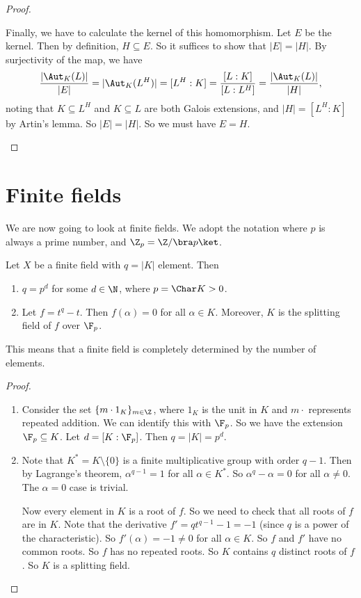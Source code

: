 \documentclass[a4paper]{article}
\begin{document}
\begin{proof}
\begin{enumerate}
      Finally, we have to calculate the kernel of this homomorphism. Let $E$ be the kernel. Then by definition, $H\subseteq E$. So it suffices to show that $|E| = |H|$. By surjectivity of the map, we have
      \[
        \frac{|\Aut_K(L)|}{|E|} = |\Aut_K(L^H)| = [L^H:K] = \frac{[L:K]}{[L:L^H]} = \frac{|\Aut_K(L)|}{|H|},
      \]
      noting that $K\subseteq L^H$ and $K\subseteq L$ are both Galois extensions, and $|H| = [L^H:K]$ by Artin's lemma. So $|E| = |H|$. So we must have $E = H$.
  \end{enumerate}
\end{proof}

\section{Finite fields}
We are now going to look at finite fields. We adopt the notation where $p$ is always a prime number, and $\Z_p =\Z/\bra p\ket$.

\begin{lemma}
  Let $X$ be a finite field with $q = |K|$ element. Then
  \begin{enumerate}
    \item $q = p^d$ for some $d \in \N$, where $p = \Char K > 0$.
    \item Let $f = t^q - t$. Then $f(\alpha) = 0$ for all $\alpha \in K$. Moreover, $K$ is the splitting field of $f$ over $\F_p$.
  \end{enumerate}
\end{lemma}
This means that a finite field is completely determined by the number of elements.

\begin{proof}\leavevmode
  \begin{enumerate}
    \item Consider the set $\{m \cdot 1_K\}_{m \in \Z}$, where $1_K$ is the unit in $K$ and $m\cdot$ represents repeated addition. We can identify this with $\F_p$. So we have the extension $\F_p \subseteq K$. Let $d = [K: \F_p]$. Then $q = |K| = p^d$.

    \item Note that $K^* = K\setminus \{0\}$ is a finite multiplicative group with order $q - 1$. Then by Lagrange's theorem, $\alpha^{q - 1} = 1$ for all $\alpha\in K^*$. So $\alpha^q - \alpha = 0$ for all $\alpha \not= 0$. The $\alpha = 0$ case is trivial.

      Now every element in $K$ is a root of $f$. So we need to check that all roots of $f$ are in $K$. Note that the derivative $f' = qt^{q - 1} - 1 = -1$ (since $q$ is a power of the characteristic). So $f'(\alpha) = -1 \not= 0$ for all $\alpha \in K$. So $f$ and $f'$ have no common roots. So $f$ has no repeated roots. So $K$ contains $q$ distinct roots of $f$. So $K$ is a splitting field.
  \end{enumerate}
\end{proof}
\end{document}
